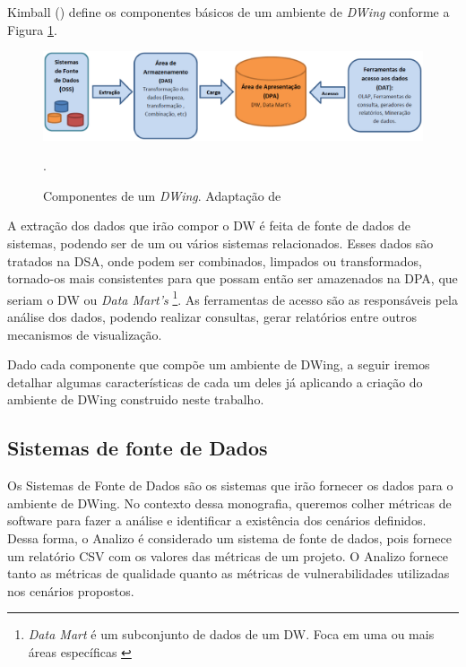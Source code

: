 Kimball (\citeyear{kimball2002}) define os componentes básicos de um ambiente de \emph{DWing} conforme a Figura \ref{componentesdw}.

 \begin{figure}[!htb]
 	\centering
 		\includegraphics[scale=0.5]{figuras/componentesDW}
 		\caption{Componentes de um \emph{DWing}. Adaptação de \cite{kimball2002}}.
 		\label{componentesdw}
 \end{figure}


 A extração dos dados que irão compor o DW é feita de fonte de dados de sistemas, podendo ser de um ou vários sistemas relacionados. Esses dados são tratados na DSA, onde podem ser combinados, limpados ou transformados, tornado-os mais consistentes para que possam então ser amazenados na DPA, que seriam o DW ou \emph{Data Mart's}
 \footnote{\emph{Data Mart} é um subconjunto de dados de um DW. Foca em uma ou mais áreas específicas \cite{kimball2002}}. 
 As ferramentas de acesso são as responsáveis pela análise dos dados, podendo realizar consultas, gerar relatórios entre outros mecanismos de visualização.

Dado cada componente que compõe um ambiente de DWing, a seguir iremos detalhar algumas características de cada um deles já aplicando a criação do ambiente de DWing construido neste trabalho.

\subsection{Sistemas de fonte de Dados}

Os Sistemas de Fonte de Dados são os sistemas que irão fornecer os dados para o ambiente de DWing. No contexto dessa monografia, queremos colher métricas de software para fazer a análise e identificar a existência dos cenários definidos. Dessa forma, o Analizo é considerado um sistema de fonte de dados, pois fornece um relatório CSV com os valores das métricas de um projeto. O Analizo fornece tanto as métricas de qualidade quanto as métricas de vulnerabilidades utilizadas nos cenários propostos. 

